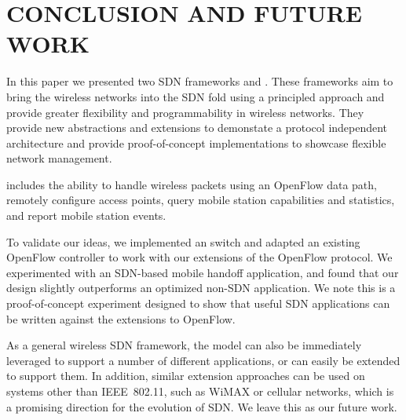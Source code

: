 \chapter{\uppercase {Conclusion and Future Work}}
\label{sec:conclusion}

In this paper we presented two SDN frameworks \aetherflow and \crossflow.  These frameworks aim to bring the wireless networks into the SDN fold using a principled approach and provide greater flexibility and programmability in wireless networks. They provide new abstractions and extensions to demonstate a protocol independent architecture and provide proof-of-concept implementations to showcase flexible network management.

\aetherflow includes the ability to handle wireless packets using an OpenFlow
data path, remotely configure access points, query mobile
station capabilities and statistics, and report mobile station events.

To validate our ideas, we implemented an \aetherflow switch and adapted an
existing OpenFlow controller to work with our extensions of the OpenFlow
protocol. We experimented with an SDN-based mobile handoff application, and
found that our design slightly outperforms an optimized non-SDN application.
We note this is a proof-of-concept experiment designed to show that useful SDN
applications can be written against the \aetherflow extensions to OpenFlow.

As a general  wireless SDN framework, the \aetherflow model can also
be immediately leveraged to support a number of different applications, or can
easily be extended to support them. In addition, similar extension approaches
can be used on systems other than IEEE~802.11, such as WiMAX or cellular
networks, which is a promising direction for the evolution of SDN. We leave this
as our future work.

% 
% 
% 
% 



